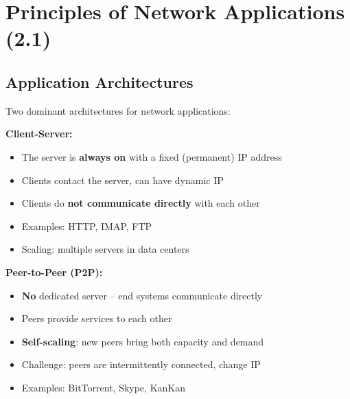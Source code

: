 \section{Principles of Network Applications (2.1)}

\subsection{Application Architectures}

Two dominant architectures for network applications:

\begin{keybox}
\textbf{Client-Server:}
\begin{itemize}[noitemsep]
    \item The server is \textbf{always on} with a fixed (permanent) IP address
    \item Clients contact the server, can have dynamic IP
    \item Clients do \textbf{not communicate directly} with each other
    \item Examples: HTTP, IMAP, FTP
    \item Scaling: multiple servers in data centers
\end{itemize}

\textbf{Peer-to-Peer (P2P):}
\begin{itemize}[noitemsep]
    \item \textbf{No} dedicated server -- end systems communicate directly
    \item Peers provide services to each other
    \item \textbf{Self-scaling}: new peers bring both capacity and demand
    \item Challenge: peers are intermittently connected, change IP
    \item Examples: BitTorrent, Skype, KanKan
\end{itemize}
\end{keybox}

